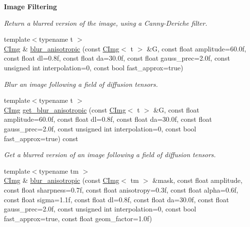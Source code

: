 \begin{Indent}{\bf Image Filtering}
\begin{DoxyCompactItemize}
\begin{DoxyCompactList}\small\item\em Return a blurred version of the image, using a Canny-\/Deriche filter. \item\end{DoxyCompactList}\item 
{\footnotesize template$<$typename t $>$ }\\\hyperlink{structcimg__library_1_1_c_img}{CImg} \& \hyperlink{structcimg__library_1_1_c_img_a7a1d14a82da58988859f7a04f74ad023}{blur\_\-anisotropic} (const \hyperlink{structcimg__library_1_1_c_img}{CImg}$<$ t $>$ \&G, const float amplitude=60.0f, const float dl=0.8f, const float da=30.0f, const float gauss\_\-prec=2.0f, const unsigned int interpolation=0, const bool fast\_\-approx=true)
\begin{DoxyCompactList}\small\item\em Blur an image following a field of diffusion tensors. \item\end{DoxyCompactList}\item 
{\footnotesize template$<$typename t $>$ }\\\hyperlink{structcimg__library_1_1_c_img}{CImg} \hyperlink{structcimg__library_1_1_c_img_aa8f424352f81af958edfaf4603d021c6}{get\_\-blur\_\-anisotropic} (const \hyperlink{structcimg__library_1_1_c_img}{CImg}$<$ t $>$ \&G, const float amplitude=60.0f, const float dl=0.8f, const float da=30.0f, const float gauss\_\-prec=2.0f, const unsigned int interpolation=0, const bool fast\_\-approx=true) const 
\begin{DoxyCompactList}\small\item\em Get a blurred version of an image following a field of diffusion tensors. \item\end{DoxyCompactList}\item 
\hypertarget{structcimg__library_1_1_c_img_a90933be598bee3dbe864b51e16b05c93}{
{\footnotesize template$<$typename tm $>$ }\\\hyperlink{structcimg__library_1_1_c_img}{CImg} \& \hyperlink{structcimg__library_1_1_c_img_a90933be598bee3dbe864b51e16b05c93}{blur\_\-anisotropic} (const \hyperlink{structcimg__library_1_1_c_img}{CImg}$<$ tm $>$ \&mask, const float amplitude, const float sharpness=0.7f, const float anisotropy=0.3f, const float alpha=0.6f, const float sigma=1.1f, const float dl=0.8f, const float da=30.0f, const float gauss\_\-prec=2.0f, const unsigned int interpolation=0, const bool fast\_\-approx=true, const float geom\_\-factor=1.0f)}
\label{structcimg__library_1_1_c_img_a90933be598bee3dbe864b51e16b05c93}


\end{DoxyCompactItemize}
\end{Indent}
